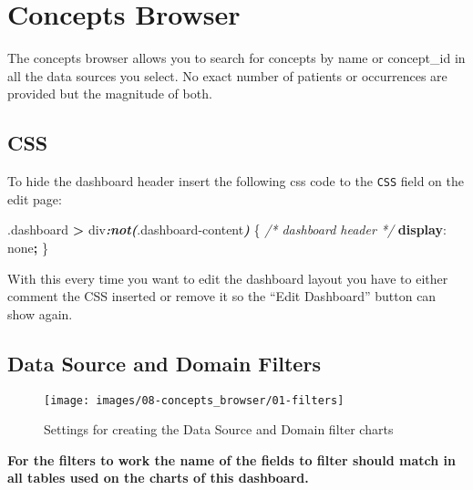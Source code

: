\documentclass[
]{book}
\newenvironment{Shaded}{\begin{snugshade}}{\end{snugshade}}
\newcommand{\CommentTok}[1]{\textcolor[rgb]{0.56,0.35,0.01}{\textit{#1}}}
\newcommand{\DecValTok}[1]{\textcolor[rgb]{0.00,0.00,0.81}{#1}}
\newcommand{\FunctionTok}[1]{\textcolor[rgb]{0.00,0.00,0.00}{#1}}
\newcommand{\InformationTok}[1]{\textcolor[rgb]{0.56,0.35,0.01}{\textbf{\textit{#1}}}}
\newcommand{\KeywordTok}[1]{\textcolor[rgb]{0.13,0.29,0.53}{\textbf{#1}}}
\newcommand{\NormalTok}[1]{#1}
\newcommand{\OperatorTok}[1]{\textcolor[rgb]{0.81,0.36,0.00}{\textbf{#1}}}
\begin{document}
\hypertarget{concepts-browser}{%
\section{Concepts Browser}\label{concepts-browser}}

The concepts browser allows you to search for concepts by name or concept\_id in all the data sources you select. No exact number of patients or occurrences are provided but the magnitude of both.

\hypertarget{css-5}{%
\subsection*{CSS}\label{css-5}}

To hide the dashboard header insert the following css code to the \texttt{CSS} field on the edit page:

\begin{Shaded}
\begin{Highlighting}[]
\FunctionTok{.dashboard} \OperatorTok{\textgreater{}}\NormalTok{ div}\InformationTok{:not(}\FunctionTok{.dashboard{-}content}\InformationTok{)}\NormalTok{ \{  }\CommentTok{/* dashboard header */}
  \KeywordTok{display}\NormalTok{: }\DecValTok{none}\OperatorTok{;}
\NormalTok{\}}
\end{Highlighting}
\end{Shaded}

With this every time you want to edit the dashboard layout you have to either comment the CSS inserted
or remove it so the ``Edit Dashboard'' button can show again.

\hypertarget{data-source-and-domain-filters}{%
\subsection*{Data Source and Domain Filters}\label{data-source-and-domain-filters}}

\begin{figure}
\texttt{[image: images/08-concepts\_browser/01-filters]} \caption{Settings for creating the Data Source and Domain filter charts}\label{fig:filters}
\end{figure}

\textbf{For the filters to work the name of the fields to filter should match in all tables used on the charts of this dashboard.}
\end{document}
